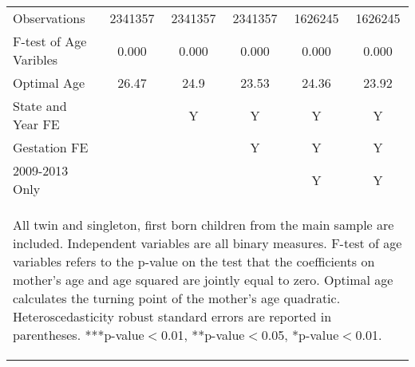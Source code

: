 \documentclass[a4paper, 11.5 pt]{article}
\theoremstyle{plain}
\begin{document}
\begin{doublespace}
\begin{table}[htbp]
\begin{tabular}{l*{5}{c}}
\midrule
Observations        &     2341357   &     2341357   &     2341357   &     1626245   &     1626245   \\
F-test of Age Varibles&0.000&0.000&0.000&0.000&0.000 \\
Optimal Age &26.47&24.9&23.53&24.36&23.92 \\
State and Year FE&&Y&Y&Y&Y\\ Gestation FE &&&Y&Y&Y\\
2009-2013 Only&&&&Y&Y\\ \bottomrule
\multicolumn{6}{p{16cm}}{\begin{footnotesize} All twin and singleton,
first born children from the main sample are included. Independent
variables are all binary measures. F-test of age variables refers to the p-value on the test that               the coefficients on mother's age and age squared are jointly               equal to zero. Optimal age calculates the turning point of the mother's age               quadratic. Heteroscedasticity robust standard errors are reported in               parentheses.
***p-value$<$0.01, **p-value$<$0.05, *p-value$<$0.01.
\end{footnotesize}}\end{tabular}\end{table}









\end{doublespace}
\end{document}
